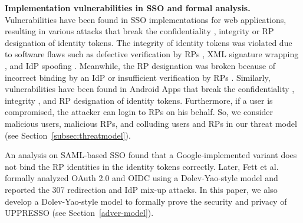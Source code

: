 \noindent\textbf{Implementation vulnerabilities in SSO and formal analysis.}
Vulnerabilities have been found in SSO implementations for web applications, resulting in various attacks %
that break the confidentiality \cite{WangCW12,ccsSunB12,ArmandoCCCPS13,DiscoveringJCS,dimvaLiM16}, integrity \cite{WangCW12,SomorovskyMSKJ12,WangZLG16,MainkaMS16, MainkaMSW17,dimvaLiM16} or RP designation \cite{WangZLG16,MainkaMS16,MainkaMSW17,YangLCZ18,dimvaLiM16} of identity tokens.
The integrity of identity tokens was violated %
due to software flaws such as defective verification by RPs \cite{WangCW12,WangZLG16,MainkaMSW17}, XML signature wrapping \cite{SomorovskyMSKJ12}, and IdP spoofing \cite{MainkaMS16,MainkaMSW17}. Meanwhile, the RP designation was broken because of incorrect binding by an IdP \cite{YangLCZ18,WangZLG16} or insufficient verification by RPs \cite{MainkaMS16,MainkaMSW17,YangLCZ18}. Similarly, vulnerabilities have been found in Android Apps that break the confidentiality \cite{ChenPCTKT14,WangZLLYLG15,YangLS17,ShiWL19}, integrity \cite{ChenPCTKT14,YangLS17}, and RP designation \cite{ChenPCTKT14,ShiWL19} of identity tokens. Furthermore, if a user is compromised, the     attacker can login to RPs on his behalf. So, we consider malicious users, malicious RPs, and colluding users and RPs in our threat model (see Section~\ref{subsec:threatmodel}).

An analysis on SAML-based SSO \cite{ArmandoCCCT08} found that a Google-implemented variant does not bind the RP identities in the identity tokens correctly. Later, Fett et al. \cite{FettKS16, FettKS17} formally analyzed OAuth 2.0 and OIDC using a Dolev-Yao-style model \cite{FettKS14} and reported the 307 redirection and IdP mix-up attacks.
In this paper, we also develop a Dolev-Yao-style model to formally prove the security and privacy of UPPRESSO (see Section~\ref{adver-model}).




